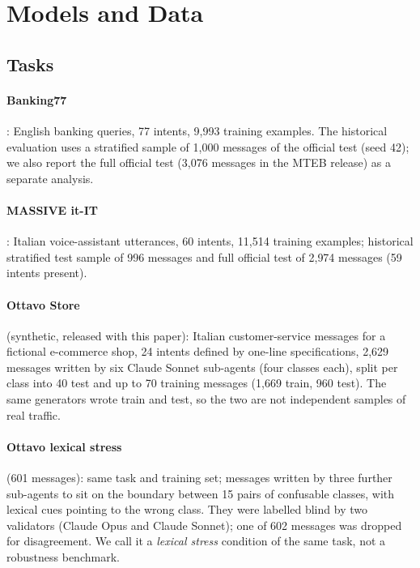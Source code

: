 \section{Models and Data}
\label{sec:data}

\subsection{Tasks}

\paragraph{Banking77} \citep{casanueva2020banking77}: English banking queries, 77 intents, 9{,}993 training examples. The historical
evaluation uses a stratified sample of 1{,}000 messages of the official test (seed 42); we also report the full official test
(3{,}076 messages in the MTEB release) as a separate analysis.

\paragraph{MASSIVE it-IT} \citep{fitzgerald2022massive}: Italian voice-assistant utterances, 60 intents, 11{,}514 training examples;
historical stratified test sample of 996 messages and full official test of 2{,}974 messages (59 intents present).

\paragraph{Ottavo Store} (synthetic, released with this paper): Italian customer-service messages for a fictional e-commerce shop,
24 intents defined by one-line specifications, 2{,}629 messages written by six Claude Sonnet sub-agents (four classes each), split
per class into 40 test and up to 70 training messages (1{,}669 train, 960 test). The same generators wrote train and test, so the two
are not independent samples of real traffic.

\paragraph{Ottavo lexical stress} (601 messages): same task and training set; messages written by three further sub-agents to sit on
the boundary between 15 pairs of confusable classes, with lexical cues pointing to the wrong class. They were labelled blind by two
validators (Claude Opus and Claude Sonnet); one of 602 messages was dropped for disagreement. We call it a \emph{lexical stress}
condition of the same task, not a robustness benchmark.

